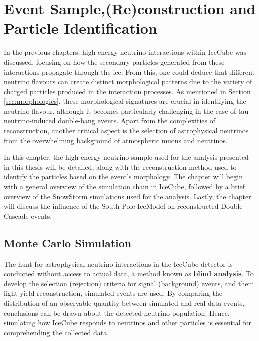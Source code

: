 \setchapterpreamble[u]{\margintoc}
\chapter{Event Sample,(Re)construction and Particle Identification}
In the previous chapters, high-energy neutrino interactions within IceCube was discussed, focusing on how the secondary particles generated from these interactions propagate through the ice. From this, one could deduce that different neutrino flavours can create distinct morphological patterns due to the variety of charged particles produced in the interaction processes. As mentioned in Section \ref{sec:morphologies}, these morphological signatures are crucial in identifying the neutrino flavour, although it becomes particularly challenging in the case of tau neutrino-induced double-bang events. Apart from the complexities of reconstruction, another critical aspect is the selection of astrophysical neutrinos from the overwhelming background of atmospheric muons and neutrinos.

In this chapter, the high-energy neutrino sample used for the analysis presented in this thesis will be detailed, along with the reconstruction method used to identify the particles based on the event's morphology. The chapter will begin with a general overview of the simulation chain in IceCube, followed by a brief overview of the SnowStorm simulations used for the analysis. Lastly, the chapter will discuss the influence of the South Pole IceModel on reconstructed Double Cascade events.

\section{Monte Carlo Simulation} 
\label{sec:mc_sim}
The hunt for astrophysical neutrino interactions in the IceCube detector is conducted without access to actual data, a method known as \textbf{blind analysis}. To develop the selection (rejection) criteria for signal (background) events, and their light yield reconstruction, simulated events are used. By comparing the distribution of an observable quantity between simulated and real data events, conclusions can be drawn about the detected neutrino population. Hence, simulating how IceCube responds to neutrinos and other particles is essential for comprehending the collected data. 

